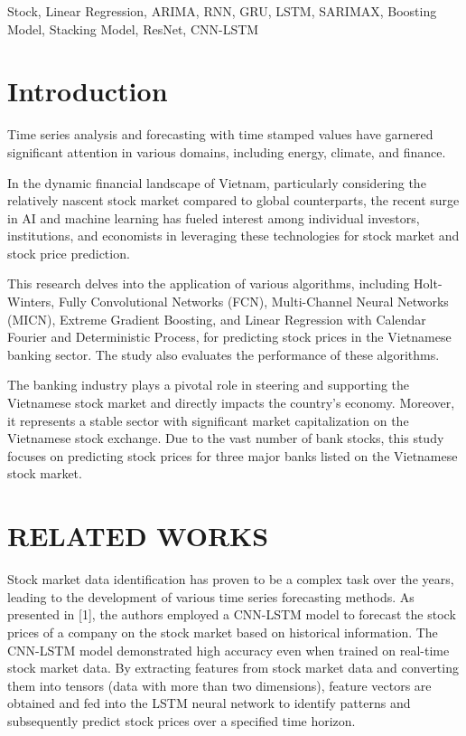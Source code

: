 \documentclass[conference]{IEEEtran}
\begin{document}
\begin{IEEEkeywords}
Stock, Linear Regression, ARIMA, RNN, GRU, LSTM, SARIMAX, Boosting Model, Stacking Model, ResNet, CNN-LSTM
\end{IEEEkeywords}

\section{Introduction}
Time series analysis and forecasting with time stamped values have garnered significant attention in various domains, including energy, climate, and finance.

In the dynamic financial landscape of Vietnam, particularly considering the relatively nascent stock market compared to global counterparts, the recent surge in AI and machine learning has fueled interest among individual investors, institutions, and economists in leveraging these technologies for stock market and stock price prediction.

This research delves into the application of various algorithms, including Holt-Winters, Fully Convolutional Networks (FCN), Multi-Channel Neural Networks (MICN), Extreme Gradient Boosting, and Linear Regression with Calendar Fourier and Deterministic Process, for predicting stock prices in the Vietnamese banking sector. The study also evaluates the performance of these algorithms.

The banking industry plays a pivotal role in steering and supporting the Vietnamese stock market and directly impacts the country's economy. Moreover, it represents a stable sector with significant market capitalization on the Vietnamese stock exchange. Due to the vast number of bank stocks, this study focuses on predicting stock prices for three major banks listed on the Vietnamese stock market.

\section{RELATED WORKS}
Stock market data identification has proven to be a complex task over the years, leading to the development of various time series forecasting methods. As presented in [1], the authors employed a CNN-LSTM model to forecast the stock prices of a company on the stock market based on historical information. The CNN-LSTM model demonstrated high accuracy even when trained on real-time stock market data. By extracting features from stock market data and converting them into tensors (data with more than two dimensions), feature vectors are obtained and fed into the LSTM neural network to identify patterns and subsequently predict stock prices over a specified time horizon.
\end{document}
